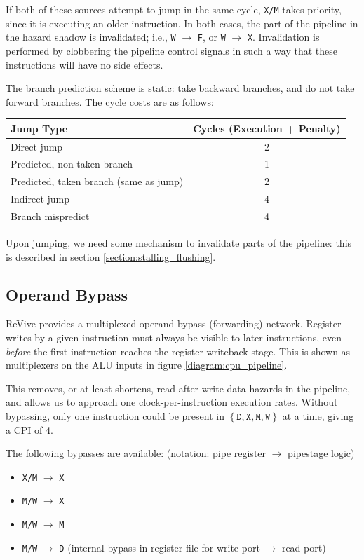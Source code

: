 \documentclass{article}
\begin{document}
If both of these sources attempt to jump in the same cycle, \texttt{X/M} takes priority, since it is executing an older instruction. In both cases, the part of the pipeline in the hazard shadow is invalidated; i.e., \texttt{W} $\to$ \texttt{F}, or \texttt{W} $\to$ \texttt{X}. Invalidation is performed by clobbering the pipeline control signals in such a way that these instructions will have no side effects.

The branch prediction scheme is static: take backward branches, and do not take forward branches. The cycle costs are as follows:

\begin{center}
\begin{tabular}{l c}
\hline
Jump Type & Cycles (Execution + Penalty) \\
\hline
Direct jump & 2 \\
Predicted, non-taken branch & 1 \\
Predicted, taken branch (same as jump) & 2 \\
Indirect jump & 4 \\
Branch mispredict & 4 \\
\hline
\end{tabular}
\end{center}

Upon jumping, we need some mechanism to invalidate parts of the pipeline: this is described in section \ref{section:stalling_flushing}.

\subsection{Operand Bypass}

ReVive provides a multiplexed operand bypass (forwarding) network. Register writes by a given instruction must always be visible to later instructions, even \textit{before} the first instruction reaches the register writeback stage. This is shown as multiplexers on the ALU inputs in figure \ref{diagram:cpu_pipeline}.

This removes, or at least shortens, read-after-write data hazards in the pipeline, and allows us to approach one clock-per-instruction execution rates. Without bypassing, only one instruction could be present in $\left\{ \texttt{D}, \texttt{X}, \texttt{M}, \texttt{W} \right\}$ at a time, giving a CPI of 4.

The following bypasses are available: (notation: pipe register $\to$ pipestage logic)

\begin{itemize}
	\item \texttt{X/M} $\to$ \texttt{X}
	\item \texttt{M/W} $\to$ \texttt{X}
	\item \texttt{M/W} $\to$ \texttt{M}
	\item \texttt{M/W} $\to$ \texttt{D} (internal bypass in register file for write port $\to$ read port)
\end{itemize}
\end{document}

